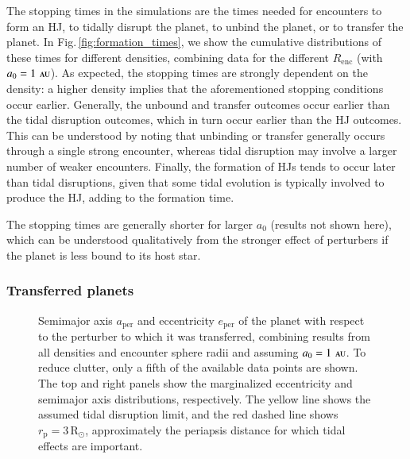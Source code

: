 \documentclass[iop,usenatbib]{emulateapj}
\newcommand{\F}{Fig.}
\newcommand{\rsun}{\mathrm{R}_\odot}
\newcommand{\au}{\,\textsc{au}}
\newcommand{\renc}{R_\mathrm{enc}}
\begin{document}
The stopping times in the simulations are the times needed for encounters to form an HJ, to tidally disrupt the planet, to unbind the planet, or to transfer the planet. In \F\,\ref{fig:formation_times}, we show the cumulative distributions of these times for different densities, combining data for the different $\renc$ (with $a_0=1\,\au$). As expected, the stopping times are strongly dependent on the density: a higher density implies that the aforementioned stopping conditions occur earlier. Generally, the unbound and transfer outcomes occur earlier than the tidal disruption outcomes, which in turn occur earlier than the HJ outcomes. This can be understood by noting that unbinding or transfer generally occurs through a single strong encounter, whereas tidal disruption may involve a larger number of weaker encounters. Finally, the formation of HJs tends to occur later than tidal disruptions, given that some tidal evolution is typically involved to produce the HJ, adding to the formation time. 

The stopping times are generally shorter for larger $a_0$ (results not shown here), which can be understood qualitatively from the stronger effect of perturbers if the planet is less bound to its host star. 


\subsubsection{Transferred planets}
\label{sect:pop_syn:trans}

\begin{figure}
\center
\iftoggle{ApJFigs}{
\texttt{[image: transferred\_planets\_run05.eps]}
}{
\texttt{[image: figs/transferred\_planets\_run05.eps]}
}
\caption { Semimajor axis $a_\mathrm{per}$ and eccentricity $e_\mathrm{per}$ of the planet with respect to the perturber to which it was transferred, combining results from all densities and encounter sphere radii and assuming $a_0=1\,\au$.  To reduce clutter, only a fifth of the available data points are shown. The top and right panels show the marginalized eccentricity and semimajor axis distributions, respectively. The yellow line shows the assumed tidal disruption limit, and the red dashed line shows $r_\mathrm{p} = 3 \,\rsun$, approximately the periapsis distance for which tidal effects are important. }
\label{fig:transferred_planets}
\end{figure}
\end{document}
